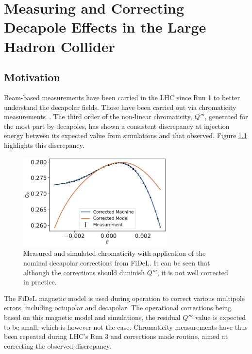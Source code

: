 \chapter{Measuring and Correcting Decapole Effects in the Large Hadron Collider}
\thumbforchapter{}
\chaptertoc{}
\newpage

\section{Motivation}

Beam-based measurements have been carried in the LHC since Run 1 to better understand the decapolar
fields. Those have been carried out via chromaticity
measurements~\cite{maclean_non-linear_2011,maclean_commissioning_2016,maclean_measurement_2014}. 
The third order of the non-linear chromaticity, $Q'''$, generated for the most part by decapoles,
has shown a consistent discrepancy at injection energy between its expected value from simulations
and that observed. Figure \ref{fig:decapoles:bare_chroma_vs_simulations} highlights this
discrepancy.

\begin{figure}[H]
    \centering
    \includegraphics[width=0.7\textwidth]{images/dq3_corrected_simulation_fidel.pdf}
    \caption{Measured and simulated chromaticity with application of the nominal decapolar
    corrections from FiDeL. It can be seen that although the corrections should diminish $Q'''$, it
    is not well corrected in practice.}
    \label{fig:decapoles:bare_chroma_vs_simulations}
\end{figure}

The FiDeL magnetic model is used during operation to correct various multipole errors, including
octupolar and decapolar. The operational corrections being based on this magnetic model and
simulations, the residual $Q'''$ value is expected to be small, which is however not the case.
Chromaticity measurements have thus been repeated during LHC's Run 3 and corrections made routine,
aimed at correcting the observed discrepancy.

